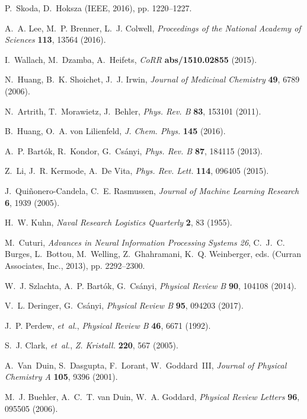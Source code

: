 \documentclass[12pt]{article}
\begin{document}
\begin{thebibliography}{10}
P.~Skoda, D.~Hoksza (IEEE, 2016), pp. 1220--1227.

A.~A. Lee, M.~P. Brenner, L.~J. Colwell, {\it Proceedings of the National
  Academy of Sciences\/} {\bf 113}, 13564 (2016).

I.~Wallach, M.~Dzamba, A.~Heifets, {\it CoRR\/} {\bf abs/1510.02855} (2015).

N.~Huang, B.~K. Shoichet, J.~J. Irwin, {\it Journal of Medicinal Chemistry\/}
  {\bf 49}, 6789 (2006).

N.~Artrith, T.~Morawietz, J.~Behler, {\it Phys. Rev. B\/} {\bf 83}, 153101
  (2011).

B.~Huang, O.~A. von Lilienfeld, {\it J. Chem. Phys.\/} {\bf 145} (2016).

A.~P. Bart{\'{o}}k, R.~Kondor, G.~Cs{\'{a}}nyi, {\it Phys. Rev. B\/} {\bf 87},
  184115 (2013).

Z.~Li, J.~R. Kermode, A.~{De Vita}, {\it Phys. Rev. Lett.\/} {\bf 114}, 096405
  (2015).

J.~Qui{\~ n}onero-Candela, C.~E. Rasmussen, {\it Journal of Machine Learning
  Research\/} {\bf 6}, 1939 (2005).

H.~W. Kuhn, {\it Naval Research Logistics Quarterly\/} {\bf 2}, 83 (1955).

M.~Cuturi, {\it Advances in Neural Information Processing Systems 26\/},
  C.~J.~C. Burges, L.~Bottou, M.~Welling, Z.~Ghahramani, K.~Q. Weinberger, eds.
  (Curran Associates, Inc., 2013), pp. 2292--2300.

W.~J. Szlachta, A.~P. Bart\'ok, G.~Cs\'anyi, {\it Physical Review B\/} {\bf
  90}, 104108 (2014).

V.~L. Deringer, G.~Cs\'anyi, {\it Physical Review B\/} {\bf 95}, 094203 (2017).

J.~P. Perdew, {\it et~al.\/}, {\it Physical Review B\/} {\bf 46}, 6671 (1992).

S.~J. Clark, {\it et~al.\/}, {\it Z. Kristall.\/} {\bf 220}, 567 (2005).

A.~Van~Duin, S.~Dasgupta, F.~Lorant, W.~Goddard~III, {\it Journal of Physical
  Chemistry A\/} {\bf 105}, 9396 (2001).

M.~J. Buehler, A.~C.~T. van Duin, W.~A. Goddard, {\it Physical Review
  Letters\/} {\bf 96}, 095505 (2006).


\end{thebibliography}
\end{document}
